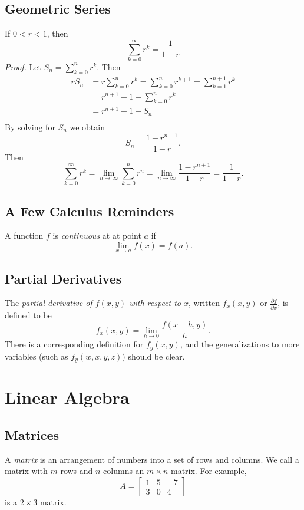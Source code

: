 \documentclass[reqno]{immbook}
\begin{document}
\section{Geometric Series}
If $0 < r < 1$, then
\begin{equation}
   \sum_{k=0}^{\infty} r^k = \frac{1}{1-r}
\end{equation}
\noindent
\emph{Proof.}
Let $S_n = \sum_{k=0}^{n} r^k$.
Then
\[
\begin{split}
    rS_n & = r\sum_{k=0}^n r^k 
           = \sum_{k=0}^n r^{k+1} 
	   = \sum_{k=1}^{n+1} r^k \\
	 & = r^{n+1} - 1 + \sum_{k=0}^{n} r^k  \\
	 & = r^{n+1} -1 + S_n \\
\end{split}
\]
By solving for $S_n$ we obtain
\[
  S_n = \frac{1-r^{n+1}}{1-r}.
\]
Then
\[
  \sum_{k=0}^{\infty} r^k
    = \lim_{n\rightarrow\infty} \sum_{k=0}^{n} r^n
    = \lim_{n\rightarrow\infty} \frac{1-r^{n+1}}{1-r}
    = \frac{1}{1-r}.
\]
%
\section{A Few Calculus Reminders}

A function $f$ is \emph{continuous} at at point $a$ if
\[
  \lim_{x\rightarrow a} f(x) = f(a).
\]
%
%
\section{Partial Derivatives}
\label{sec:PartialDerivs}
The \emph{partial derivative of $f(x,y)$ with respect to $x$},
written $f_x(x,y)$ or $\frac{\partial f}{\partial x}$, is
defined to be
\[
   f_x(x,y) = \lim_{h\rightarrow 0} \frac{f(x+h,y)}{h}.
\]
There is a corresponding definition for $f_y(x,y)$,
and the generalizations to more variables
(such as $f_y(w,x,y,z)$) should be clear.
%
%
\chapter{Linear Algebra}
%
\section{Matrices}
A \emph{matrix} is an arrangement of numbers into
a set of rows and columns.  We call a matrix with
$m$ rows and $n$ columns an $m\times n$ matrix.
For example,
\[
   A = \begin{bmatrix}
           1 & 5 & -7 \\ 3 & 0 & 4
       \end{bmatrix}
\]
is a $2\times 3$ matrix.
%
\end{document}

